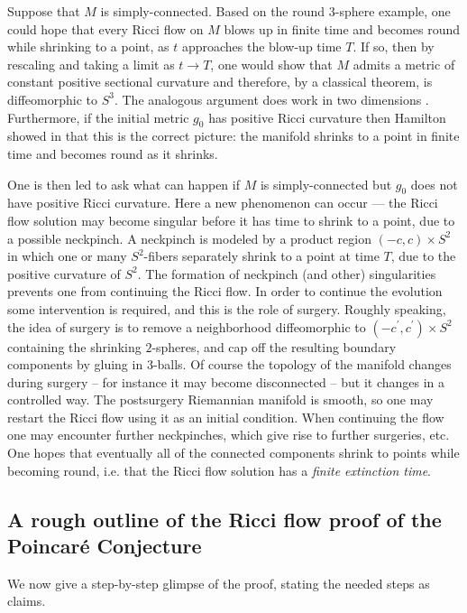 Suppose that $M$ is simply-connected.
Based on the round $3$-sphere example, one could hope that every Ricci flow
on $M$ blows up in finite time and becomes round while shrinking to a  point,
as $t$ approaches the blow-up time $T$. If so, then
by rescaling and taking a limit as $t \rightarrow T$, one would show
that $M$ admits a metric of constant positive sectional curvature and
therefore,
by a classical theorem, is diffeomorphic to $S^3$. The analogous argument does work
in two dimensions \cite[Chapter 5]{Chow-Knopf}. Furthermore, if the initial
metric $g_0$
 has positive Ricci curvature then Hamilton
showed in \cite{Hamilton} that this is the correct picture:
the manifold shrinks to a point in finite time and becomes round
as it shrinks.

One is then led to ask what can happen if $M$ is simply-connected
but $g_0$ does not have positive Ricci curvature.  Here a new
phenomenon can occur --- the Ricci flow solution may become singular
before it has time to shrink to a point, due to a possible neckpinch.
A neckpinch is modeled by a product region $(- c, c) \times S^2$ in which
one or many $S^2$-fibers separately shrink to a point at time $T$, due to the
positive curvature of $S^2$.   The formation of  neckpinch (and other)
singularities prevents one from continuing the Ricci flow.
In order to continue the evolution some intervention is required, and this
is the role of surgery.  Roughly speaking, the
idea of surgery is to remove a neighborhood diffeomorphic to
$(- c^\prime, c^\prime) \times S^2$ containing the shrinking $2$-spheres,
and cap off the resulting boundary components by
gluing in $3$-balls.   Of course the
topology of the manifold changes during surgery -- for instance it may become
disconnected -- but it changes in a controlled way.
The postsurgery Riemannian manifold is smooth,
so one may  restart the Ricci flow using
it as an initial condition.
When continuing the flow one may encounter further neckpinches,
which give rise to further surgeries, etc.
One hopes that
eventually all of the connected components
shrink to points while becoming round, i.e. that the Ricci flow solution
has a {\em finite extinction time}.


\subsection{A rough outline of the Ricci flow proof of the Poincar\'e
Conjecture}
We now give a step-by-step glimpse of the proof,
stating the needed steps as claims.

